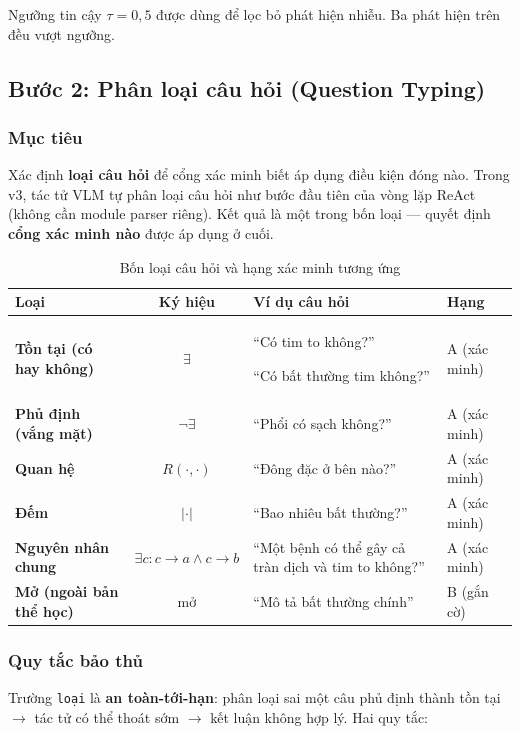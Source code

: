\documentclass[11pt,a4paper]{article}
\begin{document}
Ngưỡng tin cậy $\tau = 0{,}5$ được dùng để lọc bỏ phát hiện nhiễu. Ba phát hiện trên đều vượt ngưỡng.


\subsection{Bước 2: Phân loại câu hỏi (Question Typing)}

\subsubsection{Mục tiêu}
Xác định \textbf{loại câu hỏi} để cổng xác minh biết áp dụng điều kiện đóng nào. Trong v3, tác tử VLM tự phân loại câu hỏi như bước đầu tiên của vòng lặp ReAct (không cần module parser riêng). Kết quả là một trong bốn loại --- quyết định \textbf{cổng xác minh nào} được áp dụng ở cuối.

\begin{table}[H]
\centering\small
\renewcommand{\arraystretch}{1.4}
\begin{tabular}{>{\bfseries}p{2.8cm} c p{4.5cm} p{3cm}}
\toprule
Loại & Ký hiệu & Ví dụ câu hỏi & Hạng \\
\midrule
Tồn tại (có hay không) & $\exists$ & ``Có tim to không?'' \par ``Có bất thường tim không?'' & A (xác minh) \\
\midrule
Phủ định (vắng mặt) & $\neg\exists$ & ``Phổi có sạch không?'' & A (xác minh) \\
\midrule
Quan hệ & $R(\cdot,\cdot)$ & ``Đông đặc ở bên nào?'' & A (xác minh) \\
\midrule
Đếm & $|\cdot|$ & ``Bao nhiêu bất thường?'' & A (xác minh) \\
\midrule
Nguyên nhân chung & $\exists c: c \!\to\! a \wedge c \!\to\! b$ & ``Một bệnh có thể gây cả tràn dịch và tim to không?'' & A (xác minh) \\
\midrule
Mở (ngoài bản thể học) & mở & ``Mô tả bất thường chính'' & B (gắn cờ) \\
\bottomrule
\end{tabular}
\caption{Bốn loại câu hỏi và hạng xác minh tương ứng}
\end{table}

\subsubsection{Quy tắc bảo thủ}

Trường \texttt{loại} là \textbf{an toàn-tới-hạn}: phân loại sai một câu phủ định thành tồn tại $\to$ tác tử có thể thoát sớm $\to$ kết luận không hợp lý. Hai quy tắc:
\end{document}
